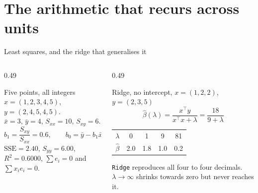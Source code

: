 \documentclass[aspectratio=169]{beamer}
\begin{document}
\section[The arithmetic]{The arithmetic that recurs across units}
\label{sec:hand}

\begin{frame}[shrink=8]{Least squares, and the ridge that generalises it}
  \begin{columns}[T]
    \begin{column}{0.49\textwidth}
      \begin{block}{Five points, all integers}
        $x = (1,2,3,4,5)$, $y = (2,4,5,4,5)$.\\
        $\bar x = 3$, $\bar y = 4$, $S_{xx} = 10$, $S_{xy} = 6$.
        \[
          b_1 = \frac{S_{xy}}{S_{xx}} = 0.6, \qquad
          b_0 = \bar y - b_1 \bar x = 2.2
        \]
        $\mathrm{SSE} = 2.40$, $S_{yy} = 6.00$, $R^2 = 0.6000$,
        $\sum e_i = 0$ and $\sum x_i e_i = 0$.
      \end{block}
    \end{column}
    \begin{column}{0.49\textwidth}
      \begin{block}{Ridge, no intercept, $x=(1,2,2)$, $y=(2,3,5)$}
        \[
          \hat\beta(\lambda) = \frac{x^{\top}y}{x^{\top}x + \lambda}
          = \frac{18}{9 + \lambda}
        \]
        \centering
        \begin{tabular}{@{}lcccc@{}}
          \toprule
          $\lambda$ & 0 & 1 & 9 & 81 \\
          $\hat\beta$ & 2.0 & 1.8 & 1.0 & 0.2 \\
          \bottomrule
        \end{tabular}
      \end{block}
      \begin{center}
        \small \texttt{Ridge} reproduces all four to four decimals.
        $\lambda \to \infty$ shrinks towards zero but never reaches it.
      \end{center}
    \end{column}
  \end{columns}
\end{frame}
\end{document}
